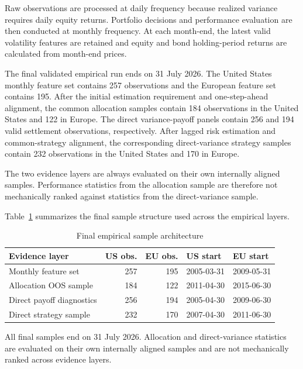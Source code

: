 Raw observations are processed at daily frequency because realized variance requires daily equity returns. Portfolio decisions and performance evaluation are then conducted at monthly frequency. At each month-end, the latest valid volatility features are retained and equity and bond holding-period returns are calculated from month-end prices.

The final validated empirical run ends on 31 July 2026. The United States monthly feature set contains 257 observations and the European feature set contains 195. After the initial estimation requirement and one-step-ahead alignment, the common allocation samples contain 184 observations in the United States and 122 in Europe. The direct variance-payoff panels contain 256 and 194 valid settlement observations, respectively. After lagged risk estimation and common-strategy alignment, the corresponding direct-variance strategy samples contain 232 observations in the United States and 170 in Europe.

The two evidence layers are always evaluated on their own internally aligned samples. Performance statistics from the allocation sample are therefore not mechanically ranked against statistics from the direct-variance sample.

Table~\ref{tab:sample_architecture} summarizes the final sample structure used across the empirical layers.

\begin{table}[htbp]
\centering
\caption{Final empirical sample architecture}
\label{tab:sample_architecture}
\small
\begin{tabular}{lrrll}
\toprule
Evidence layer & US obs. & EU obs. & US start & EU start \\
\midrule
Monthly feature set & 257 & 195 & 2005-03-31 & 2009-05-31 \\
Allocation OOS sample & 184 & 122 & 2011-04-30 & 2015-06-30 \\
Direct payoff diagnostics & 256 & 194 & 2005-04-30 & 2009-06-30 \\
Direct strategy sample & 232 & 170 & 2007-04-30 & 2011-06-30 \\
\bottomrule
\end{tabular}

\vspace{0.4em}
\begin{minipage}{0.92\textwidth}
\footnotesize
All final samples end on 31 July 2026. Allocation and direct-variance statistics are evaluated on their own internally aligned samples and are not mechanically ranked across evidence layers.
\end{minipage}
\end{table}

